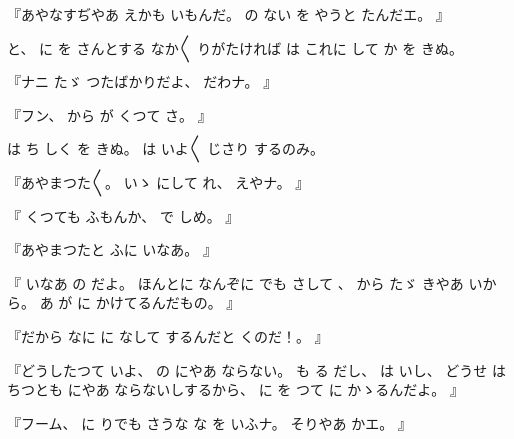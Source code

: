 %
『あやなすぢやあ
えかも
いもんだ。
%
の
ない
を
やうと
たんだエ。
』

%
と、
%
に
を
さんとする
なか〳〵
りがたければ
は
これに
して
か
を
きぬ。

%
『ナニ
たゞ
つたばかりだよ、
%
だわナ。
』

%
『フン、
%
から
が
くつて
さ。
』

%
は
ち
しく
を
きぬ。
%
は
いよ〳〵
じさり
するのみ。

%
『あやまつた〳〵。
%
いゝ
にして
れ、
%
えやナ。
』

%
『
くつても
ふもんか、
%
で
しめ。
』

%
『あやまつたと
ふに
いなあ。
』

%
『
いなあ
の
だよ。
%
ほんとに
なんぞに
でも
さして
、
%
から
たゞ
きやあ
いから。
%
あ
が
に
かけてるんだもの。
』

%
『だから
なに
に
なして
するんだと
くのだ！。
』

%
『どうしたつて
いよ、
%
の
にやあ
ならない。
%
も
る
だし、
%
は
いし、
%
どうせ
は
ちつとも
にやあ
ならないしするから、
%
に
を
つて
に
かゝるんだよ。
』

%
『フーム、
%
に
りでも
さうな
な
を
いふナ。
%
そりやあ
かエ。
』

